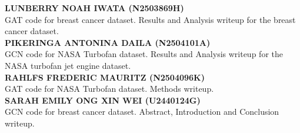 \documentclass[12pt]{article}
\begin{document}
\textbf{LUNBERRY NOAH IWATA (N2503869H)} \\
GAT code for breast cancer dataset. Results and Analysis writeup for the breast cancer dataset. \\

\textbf{PIKERINGA ANTONINA DAILA (N2504101A)} \\
GCN code for NASA Turbofan dataset. Results and Analysis writeup for the NASA turbofan jet engine dataset. \\

\textbf{RAHLFS FREDERIC MAURITZ (N2504096K)} \\
GAT code for NASA Turbofan dataset. Methods writeup. \\

\textbf{SARAH EMILY ONG XIN WEI (U2440124G)} \\
GCN code for breast cancer dataset. Abstract, Introduction and Conclusion writeup. \\

\end{document}
